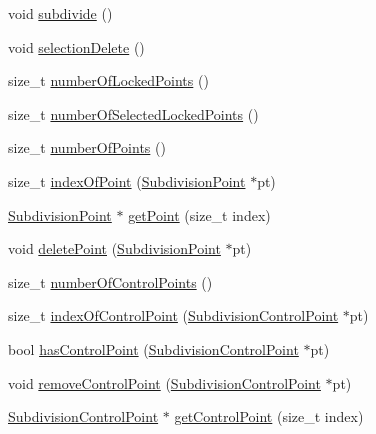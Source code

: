 \begin{DoxyCompactItemize}
\item 
void \hyperlink{classShipCAD_1_1SubdivisionSurface_ad9970c667fa8e33ff8b35eb6a48b6a2e}{subdivide} ()
\item 
void \hyperlink{classShipCAD_1_1SubdivisionSurface_a99bda5b49300775eda1df60451412686}{selection\-Delete} ()
\item 
size\-\_\-t \hyperlink{classShipCAD_1_1SubdivisionSurface_a771f0f1881a2da57dde8cb88a8fc9059}{number\-Of\-Locked\-Points} ()
\item 
size\-\_\-t \hyperlink{classShipCAD_1_1SubdivisionSurface_a2583bc0013b5725ac0902062d1c8bcea}{number\-Of\-Selected\-Locked\-Points} ()
\item 
size\-\_\-t \hyperlink{classShipCAD_1_1SubdivisionSurface_a404ffc0c4d13a3a00edb83ad439ee59e}{number\-Of\-Points} ()
\item 
size\-\_\-t \hyperlink{classShipCAD_1_1SubdivisionSurface_a1bde01d6b5972c302ad387cf1247f0fa}{index\-Of\-Point} (\hyperlink{classShipCAD_1_1SubdivisionPoint}{Subdivision\-Point} $\ast$pt)
\item 
\hyperlink{classShipCAD_1_1SubdivisionPoint}{Subdivision\-Point} $\ast$ \hyperlink{classShipCAD_1_1SubdivisionSurface_af07192c8cfc3429ad6da80a1da802a6c}{get\-Point} (size\-\_\-t index)
\item 
void \hyperlink{classShipCAD_1_1SubdivisionSurface_a4117039bfd819cb28ab5cb04296fdcd7}{delete\-Point} (\hyperlink{classShipCAD_1_1SubdivisionPoint}{Subdivision\-Point} $\ast$pt)
\item 
size\-\_\-t \hyperlink{classShipCAD_1_1SubdivisionSurface_a4e184650893ca2ac7e367778ec70c45f}{number\-Of\-Control\-Points} ()
\item 
size\-\_\-t \hyperlink{classShipCAD_1_1SubdivisionSurface_ae0dda53669e5767da6434b3e2f751916}{index\-Of\-Control\-Point} (\hyperlink{classShipCAD_1_1SubdivisionControlPoint}{Subdivision\-Control\-Point} $\ast$pt)
\item 
bool \hyperlink{classShipCAD_1_1SubdivisionSurface_a62abb29703f608a75559452d25db9a33}{has\-Control\-Point} (\hyperlink{classShipCAD_1_1SubdivisionControlPoint}{Subdivision\-Control\-Point} $\ast$pt)
\item 
void \hyperlink{classShipCAD_1_1SubdivisionSurface_aa20b9227481180329e03de8897c52933}{remove\-Control\-Point} (\hyperlink{classShipCAD_1_1SubdivisionControlPoint}{Subdivision\-Control\-Point} $\ast$pt)
\item 
\hyperlink{classShipCAD_1_1SubdivisionControlPoint}{Subdivision\-Control\-Point} $\ast$ \hyperlink{classShipCAD_1_1SubdivisionSurface_a8aa8d3fdfc5e81ba4a39858a69228652}{get\-Control\-Point} (size\-\_\-t index)

\end{DoxyCompactItemize}
